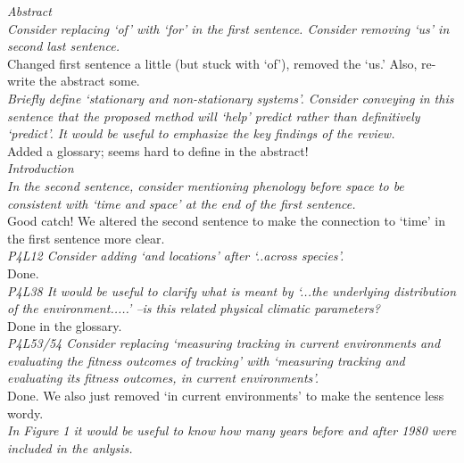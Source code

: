 \documentclass[11pt]{article}
\begin{document}
\emph{ Abstract\\
Consider replacing `of' with `for' in the first sentence. Consider removing `us' in second
last sentence.}\\

Changed first sentence a little (but stuck with `of'), removed the `us.' Also, re-write the abstract some. \\

\emph{ Briefly define `stationary and non-stationary systems'. Consider conveying in this sentence
that the proposed method will `help' predict rather than definitively `predict'. It would be
useful to emphasize the key findings of the review.}\\

Added a glossary; seems hard to define in the abstract!  \\

\emph{Introduction\\
In the second sentence, consider mentioning phenology before space to be consistent with
`time and space' at the end of the first sentence.}\\

Good catch! We altered the second sentence to make the connection to `time' in the first sentence more clear.\\

\emph{P4L12 Consider adding `and locations' after `..across species'.}\\

Done.\\

\emph{P4L38 It would be useful to clarify what is meant by `...the underlying distribution of the
environment.....' –is this related physical climatic parameters? }\\

Done in the glossary.\\

\emph{P4L53/54 Consider replacing `measuring tracking in current environments and evaluating the
fitness outcomes of tracking' with `measuring tracking and evaluating its fitness outcomes,
in current environments'. }\\

Done. We also just removed `in current environments' to make the sentence less wordy.\\

\emph{In Figure 1 it would be useful to know how many years before and after 1980 were included in
the anlysis. }\\
\end{document}
